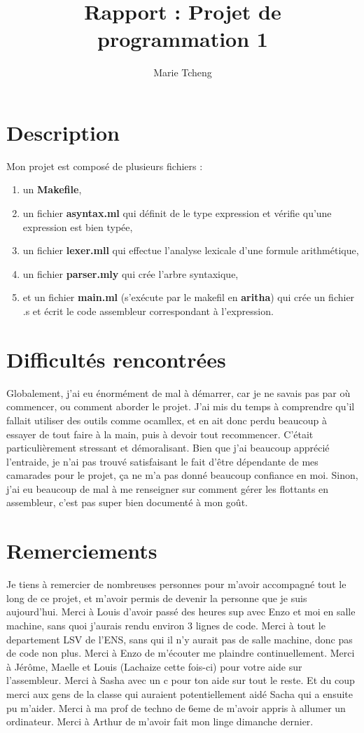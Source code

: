 \documentclass{article}
\title{Rapport : Projet de programmation 1 }
\author{Marie Tcheng }
\begin{document}
\maketitle

\section{Description}
Mon projet est composé de plusieurs fichiers : 
\begin{enumerate}
    \item un \textbf{Makefile},
    \item un fichier \textbf{asyntax.ml} qui définit de le type expression et vérifie qu'une expression est bien typée,
    \item un fichier \textbf{lexer.mll} qui effectue l'analyse lexicale d'une formule arithmétique,
    \item un fichier \textbf{parser.mly} qui crée l'arbre syntaxique,
    \item et un fichier \textbf{main.ml} (s'exécute par le makefil en \textbf{aritha}) qui crée un fichier .s et écrit le code assembleur correspondant à l'expression. 
\end{enumerate}

\section{Difficultés rencontrées}
Globalement, j'ai eu énormément de mal à démarrer, car je ne savais pas par où commencer, ou comment aborder le projet.
J'ai mis du temps à comprendre qu'il fallait utiliser des outils comme ocamllex, et en ait donc perdu beaucoup à essayer de tout faire à la main, puis à devoir tout recommencer. 
C'était particulièrement stressant et démoralisant. Bien que j'ai beaucoup apprécié l'entraide, je n'ai pas trouvé satisfaisant le fait d'être dépendante de mes camarades pour le projet, ça ne m'a pas donné beaucoup confiance en moi. 
Sinon, j'ai eu beaucoup de mal à me renseigner sur comment gérer les flottants en assembleur, c'est pas super bien documenté à mon goût. 

\section{Remerciements}
Je tiens à remercier de nombreuses personnes pour m'avoir accompagné tout le long de ce projet, et m'avoir permis de devenir la personne que je suis aujourd'hui. 
Merci à Louis d'avoir passé des heures sup avec Enzo et moi en salle machine, sans quoi j'aurais rendu environ 3 lignes de code. 
Merci à tout le departement LSV de l'ENS, sans qui il n'y aurait pas de salle machine, donc pas de code non plus. 
Merci à Enzo de m'écouter me plaindre continuellement.
Merci à Jérôme, Maelle et Louis (Lachaize cette fois-ci) pour votre aide sur l'assembleur. Merci à Sasha avec un c pour ton aide sur tout le reste.
Et du coup merci aux gens de la classe qui auraient potentiellement aidé Sacha qui a ensuite pu m'aider.
Merci à ma prof de techno de 6eme de m'avoir appris à allumer un ordinateur.
Merci à Arthur de m'avoir fait mon linge dimanche dernier. 
\end{document}
